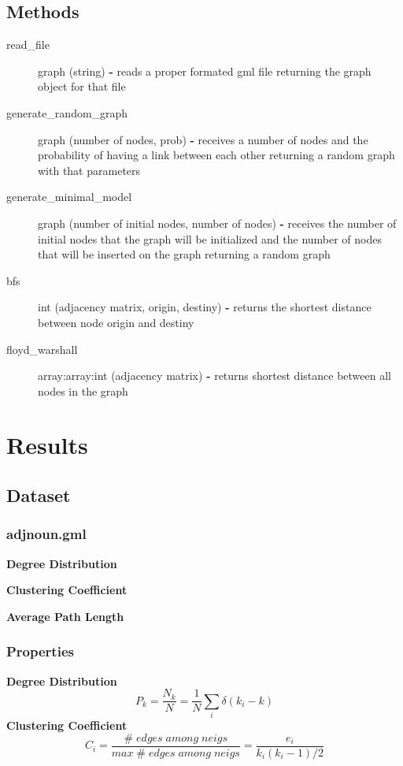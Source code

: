 \documentclass[a4paper,titlepage,11pt]{article}
\begin{document}
\subsection*{Methods}
\begin{description}
\item [read\_file] graph (string) \textbf{-} reads a proper formated gml file returning the graph object for that file
\item [generate\_random\_graph] graph (number of nodes, prob) \textbf{-} receives a number of nodes and the probability of
                                                            having a link between each other returning a random graph with that parameters
\item [generate\_minimal\_model] graph (number of initial nodes, number of nodes) \textbf{-} receives the number of initial nodes that the 																graph will be initialized and the number of nodes that will be inserted on 																 the graph returning a random graph
\item [bfs] int (adjacency matrix, origin, destiny) \textbf{-} returns the shortest distance between node origin and destiny
\item [floyd\_warshall] array:array:int (adjacency matrix) \textbf{-} returns shortest distance between all nodes in the graph 

\end{description}

\section{Results}
\subsection{Dataset}
\subsubsection{adjnoun.gml}
\textbf{Degree Distribution}

\textbf{Clustering Coefficient}

\textbf{Average Path Length}


\subsubsection{Properties}
\textbf{Degree Distribution}
\[
  P_k = \frac{N_k}{N} = \frac{1}{N}\sum_{i}{\delta(k_i-k)}
\]
\textbf{Clustering Coefficient}
\[
  C_i = \frac{\#\; edges\; among\; neigs}{max\; \# \; edges\; among \; neigs} = \frac{e_i}{k_i(k_i-1)/2}
\]
\end{document}
